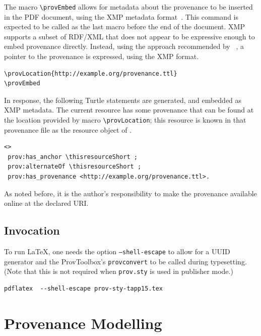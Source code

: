 \documentclass{sigplanconf}
\newcommand{\provstyMacro}[1]{{\tt \textbackslash prov{#1}}\xspace}
\newcommand{\provsty}{{\tt prov.sty}\xspace}
\begin{document}
The macro \provstyMacro{Embed} allows for metadata about the
provenance to be inserted in the PDF document, using the XMP metadata
format~\cite{Adobe_XMP_Spec_part1}.  This command is expected to be
called as the last macro before the end of the document.  XMP supports
a subset of RDF/XML that does not appear to be expressive enough to
embed \PROV provenance directly. Instead, using the approach recommended
by \PROVAQ~\cite{Klyne:prov-aq:20130430}, a pointer to the provenance
is expressed, using the XMP format.


{\footnotesize
\begin{Verbatim}
\provLocation{http://example.org/provenance.ttl}
\provEmbed
\end{Verbatim}
}

In response, the following Turtle statements are generated, and
embedded as XMP metadata. The current resource has some provenance
 that can be found at the location provided by
macro \provstyMacro{Location}; this resource is known in that
provenance file as the resource object of .

{\footnotesize
\begin{Verbatim}[commandchars=\\\{\}]
<>
 prov:has_anchor \thisresourceShort ;
 prov:alternateOf \thisresourceShort ;
 prov:has_provenance <http://example.org/provenance.ttl>.
\end{Verbatim}
}

As noted before, it is the author's responsibility to make the
provenance available online at the declared URI.

\subsection{Invocation}\label{implementation:section}

To run \LaTeX, one needs the option {\tt --shell-escape} to allow for
a UUID generator and the ProvToolbox's {\tt provconvert} to be called
during typesetting. (Note that this is not required when \provsty is
used in publisher mode.)


{\footnotesize
\begin{Verbatim}[commandchars=\\\{\}]
	pdflatex  --shell-escape prov-sty-tapp15.tex
\end{Verbatim}
}

\section{Provenance Modelling}
\end{document}
